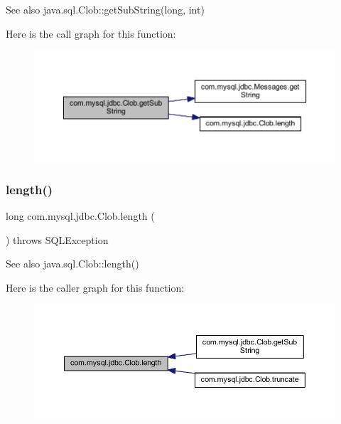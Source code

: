 \begin{DoxySeeAlso}{See also}
java.\+sql.\+Clob\+::get\+Sub\+String(long, int) 
\end{DoxySeeAlso}
Here is the call graph for this function\+:\nopagebreak
\begin{figure}[H]
\begin{center}
\leavevmode
\includegraphics[width=350pt]{classcom_1_1mysql_1_1jdbc_1_1_clob_a307a0f6842fe4db4f8753a61f5ae612c_cgraph}
\end{center}
\end{figure}
\mbox{\label{classcom_1_1mysql_1_1jdbc_1_1_clob_ac337421e5371c5ecafcffbfd75103a5d}} 
\subsubsection{\texorpdfstring{length()}{length()}}
{\footnotesize\ttfamily long com.\+mysql.\+jdbc.\+Clob.\+length (\begin{DoxyParamCaption}{ }\end{DoxyParamCaption}) throws S\+Q\+L\+Exception}

\begin{DoxySeeAlso}{See also}
java.\+sql.\+Clob\+::length() 
\end{DoxySeeAlso}
Here is the caller graph for this function\+:\nopagebreak
\begin{figure}[H]
\begin{center}
\leavevmode
\includegraphics[width=350pt]{classcom_1_1mysql_1_1jdbc_1_1_clob_ac337421e5371c5ecafcffbfd75103a5d_icgraph}
\end{center}
\end{figure}
\mbox{\label{classcom_1_1mysql_1_1jdbc_1_1_clob_a53c58ed415a8c742e66343d762219b80}} 
